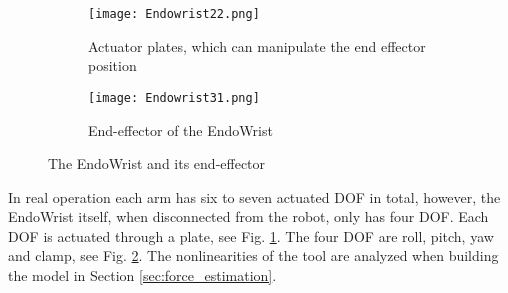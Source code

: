 \begin{figure}[h]
  \centering
  \begin{subfigure}{.22\textwidth}
    \centering
    \texttt{[image: Endowrist22.png]}
    \caption{Actuator plates, which can manipulate the end effector position}
    \label{fig:Endo_plates}
  \end{subfigure}
  \begin{subfigure}{.22\textwidth}
    \centering
    \texttt{[image: Endowrist31.png]}
    \caption{End-effector of the EndoWrist\newline}
    \label{fig:Endo_end}
  \end{subfigure}
\caption{The EndoWrist and its end-effector}
\label{fig:endowrits_set}
\end{figure}

In real operation each arm has six to seven actuated DOF in total, however, the EndoWrist itself, when disconnected from the robot, only has four DOF. Each DOF is actuated through a plate, see Fig. \ref{fig:Endo_plates}. The four DOF are roll, pitch, yaw and clamp, see Fig. \ref{fig:Endo_end}. The nonlinearities of the tool are analyzed when building the model in Section \ref{sec:force_estimation}.





